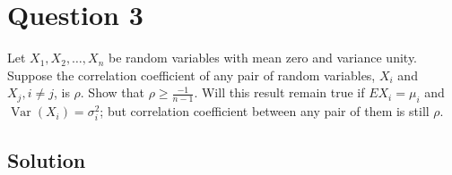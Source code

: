 \section*{Question 3}

Let \( X_{1}, X_{2}, \dots, X_{n} \) be random variables with mean zero and variance unity.
Suppose the correlation coefficient of any pair of random variables, \( X_{i} \) and \( X_{j}, i \neq j \), is \( \rho \).
Show that \( \rho \geq \frac{-1}{n-1} \).
Will this result remain true if \( E X_{i}=\mu_{i} \) and \( \operatorname{Var}\left(X_{i}\right)=\sigma_{i}^{2} \); but correlation coefficient between any pair of them is still \( \rho \).

\subsection*{Solution}
